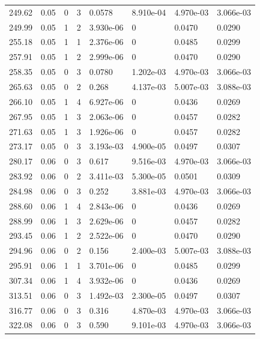 \documentclass[preview]{standalone}
\begin{document}
{{{\begin{tabular}{L{1.2cm}C{1.2cm} C{0.3cm}C{0.5cm} C{1.4cm}C{1.4cm} C{1.4cm}C{1.4cm}}
  249.62  &  0.05  & 0     &  3 &  0.0578  & 8.910e-04  & 4.970e-03 &  3.066e-03   \\ 
  249.99  &  0.05  & 1     &  2 &  3.930e-06  & 0  & 0.0470 &  0.0290   \\ 
  255.18  &  0.05  & 1     &  1 &  2.376e-06  & 0  & 0.0485 &  0.0299   \\ 
  257.91  &  0.05  & 1     &  2 &  2.999e-06  & 0  & 0.0470 &  0.0290   \\ 
  258.35  &  0.05  & 0     &  3 &  0.0780  & 1.202e-03  & 4.970e-03 &  3.066e-03   \\ 
  265.63  &  0.05  & 0     &  2 &  0.268  & 4.137e-03  & 5.007e-03 &  3.088e-03   \\ 
  266.10  &  0.05  & 1     &  4 &  6.927e-06  & 0  & 0.0436 &  0.0269   \\ 
  267.95  &  0.05  & 1     &  3 &  2.063e-06  & 0  & 0.0457 &  0.0282   \\ 
  271.63  &  0.05  & 1     &  3 &  1.926e-06  & 0  & 0.0457 &  0.0282   \\ 
  273.17  &  0.05  & 0     &  3 &  3.193e-03  & 4.900e-05  & 0.0497 &  0.0307   \\ 
  280.17  &  0.06  & 0     &  3 &  0.617  & 9.516e-03  & 4.970e-03 &  3.066e-03   \\ 
  283.92  &  0.06  & 0     &  2 &  3.411e-03  & 5.300e-05  & 0.0501 &  0.0309   \\ 
  284.98  &  0.06  & 0     &  3 &  0.252  & 3.881e-03  & 4.970e-03 &  3.066e-03   \\ 
  288.60  &  0.06  & 1     &  4 &  2.843e-06  & 0  & 0.0436 &  0.0269   \\ 
  288.99  &  0.06  & 1     &  3 &  2.629e-06  & 0  & 0.0457 &  0.0282   \\ 
  293.45  &  0.06  & 1     &  2 &  2.522e-06  & 0  & 0.0470 &  0.0290   \\ 
  294.96  &  0.06  & 0     &  2 &  0.156  & 2.400e-03  & 5.007e-03 &  3.088e-03   \\ 
  295.91  &  0.06  & 1     &  1 &  3.701e-06  & 0  & 0.0485 &  0.0299   \\ 
  307.34  &  0.06  & 1     &  4 &  3.932e-06  & 0  & 0.0436 &  0.0269   \\ 
  313.51  &  0.06  & 0     &  3 &  1.492e-03  & 2.300e-05  & 0.0497 &  0.0307   \\ 
  316.77  &  0.06  & 0     &  3 &  0.316  & 4.870e-03  & 4.970e-03 &  3.066e-03   \\ 
  322.08  &  0.06  & 0     &  3 &  0.590  & 9.101e-03  & 4.970e-03 &  3.066e-03   \\ 

\end{tabular}}}}
\end{document}
